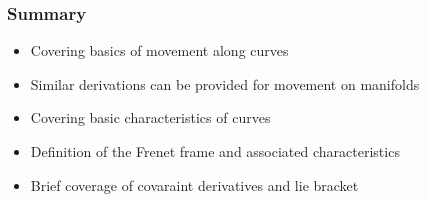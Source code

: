 \documentclass[10pt]{beamer}
\begin{document}
\begin{frame}
  \frametitle{Summary}
  \begin{itemize}
  \item Covering basics of movement along curves
  \item Similar derivations can be provided for movement on manifolds
  \item Covering basic characteristics of curves
  \item Definition of the Frenet frame and associated characteristics
  \item Brief coverage of covaraint derivatives and lie bracket
  \end{itemize}
\end{frame}
\end{document}
